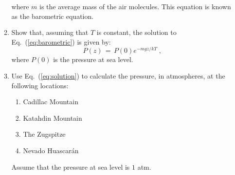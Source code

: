 \documentclass[12pt]{article}
\begin{document}
\begin{enumerate}
\begin{enumerate}
        where $m$ is the average mass of the air molecules.  This
        equation is known as the barometric equation.
      \item Show that, assuming that $T$ is constant, the solution to
        Eq.~(\ref{eq:barometric}) is given by:
        \begin{equation}
          P(z) \, = \, P(0) e^{-mgz/kT} \;,
          \label{eq:solution}
          \end{equation}
        where $P(0)$ is the pressure at sea level.
      \item Use Eq.~(\ref{eq:solution}) to calculate the pressure, in
        atmospheres, at the following locations:
        \begin{enumerate}
        \item Cadillac Mountain
        \item Katahdin Mountain
        \item The Zugspitze
        \item Nevado Huascar\'an
        \end{enumerate}
        Assume that the pressure at sea level is $1$ atm. 
    \end{enumerate}

\end{enumerate}
\end{document}

